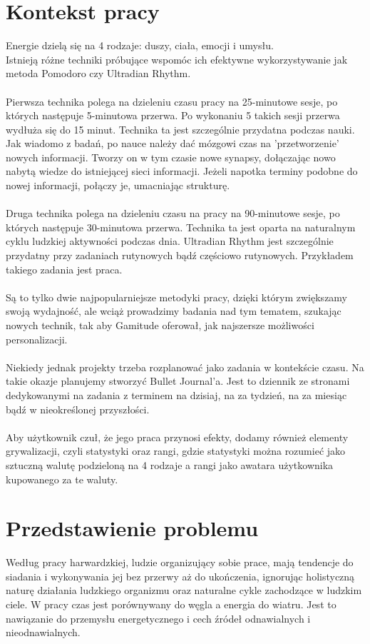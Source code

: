 \documentclass[a4paper,11pt]{report}
\begin{document}
\section{Kontekst pracy}
Energie\cite{Harward} dzielą się na 4 rodzaje: duszy, ciała, emocji i umysłu.
\\Istnieją różne techniki próbujące wspomóc ich efektywne wykorzystywanie jak metoda Pomodoro\cite{Pomodoro} czy Ultradian Rhythm\cite{90/30}.
\\\\Pierwsza technika polega na dzieleniu czasu pracy na 25-minutowe sesje, po których następuje 5-minutowa przerwa.
 Po wykonaniu 5 takich sesji przerwa wydłuża się do 15 minut.
 Technika ta jest szczególnie przydatna podczas nauki.
\\Jak wiadomo z badań, po nauce należy dać mózgowi czas na 'przetworzenie' nowych informacji.
 Tworzy on w tym czasie nowe synapsy, dołączając nowo nabytą wiedze do istniejącej sieci informacji.
 Jeżeli napotka terminy podobne do nowej informacji, połączy je,  umacniając strukturę. 
\\\\Druga technika polega na dzieleniu czasu na pracy na 90-minutowe sesje, po których następuje 30-minutowa przerwa.
 Technika ta jest oparta na naturalnym cyklu ludzkiej aktywności podczas dnia.
 Ultradian Rhythm jest szczególnie przydatny przy zadaniach rutynowych bądź częściowo rutynowych.
 Przykładem takiego zadania jest praca.
\\\\Są to tylko dwie najpopularniejsze metodyki pracy, dzięki którym zwiększamy swoją wydajność,
 ale wciąż prowadzimy badania nad tym tematem, szukając nowych technik,
 tak aby Gamitude oferował, jak najszersze możliwości personalizacji. 
\\\\Niekiedy jednak projekty trzeba rozplanować jako zadania w kontekście czasu.
 Na takie okazje planujemy stworzyć Bullet Journal\cite{bullet}'a.
 Jest to dziennik ze stronami dedykowanymi na zadania z terminem na dzisiaj,
  na za tydzień, na za miesiąc bądź w nieokreślonej przyszłości.
\\\\Aby użytkownik czuł, że jego praca przynosi efekty, dodamy również elementy grywalizacji\cite{grywalizacja}, czyli 
 statystyki oraz rangi\cite{rangi}, gdzie statystyki można rozumieć jako sztuczną walutę podzieloną na 4 rodzaje a rangi 
 jako awatara użytkownika kupowanego za te waluty.
\section{Przedstawienie problemu}
Według pracy harwardzkiej, ludzie organizujący sobie prace, mają tendencje do siadania i wykonywania jej bez przerwy aż do ukończenia,
 ignorując holistyczną naturę działania ludzkiego organizmu oraz naturalne cykle zachodzące w ludzkim ciele.
 W pracy czas jest porównywany do węgla a energia do wiatru.
 Jest to nawiązanie do przemysłu energetycznego i cech źródeł odnawialnych i nieodnawialnych.
\end{document}
